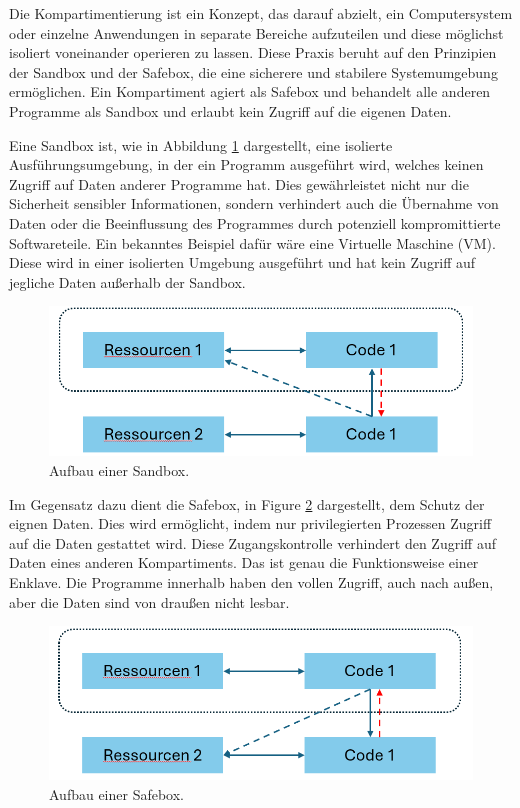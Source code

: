 Die Kompartimentierung ist ein Konzept, das darauf abzielt, ein Computersystem oder einzelne Anwendungen in separate Bereiche aufzuteilen und diese möglichst isoliert voneinander operieren zu lassen. Diese Praxis beruht auf den Prinzipien der Sandbox und der Safebox, die eine sicherere und stabilere Systemumgebung ermöglichen\cite{CIVPaper}. Ein Kompartiment agiert als Safebox und behandelt alle anderen Programme als Sandbox und erlaubt kein Zugriff auf die eigenen Daten.

Eine Sandbox ist, wie in Abbildung \ref{fig:Sandbox} dargestellt, eine isolierte Ausführungsumgebung, in der ein Programm ausgeführt wird, welches keinen Zugriff auf Daten anderer Programme hat. 
Dies gewährleistet nicht nur die Sicherheit sensibler Informationen, sondern verhindert auch die Übernahme von Daten oder die Beeinflussung des Programmes durch potenziell kompromittierte Softwareteile. 
Ein bekanntes Beispiel dafür wäre eine Virtuelle Maschine (VM). Diese wird in einer isolierten Umgebung ausgeführt und hat kein Zugriff auf jegliche Daten außerhalb der Sandbox.
\begin{figure}[h]
    \centering
    \includegraphics[width=0.8\linewidth]{Grafiken/Sandbox.png}
    \caption{Aufbau einer Sandbox.}
    \label{fig:Sandbox}
\end{figure}


Im Gegensatz dazu dient die Safebox, in Figure \ref{fig:Safebox} dargestellt, dem Schutz der eignen Daten. Dies wird ermöglicht, indem nur privilegierten Prozessen Zugriff auf die Daten gestattet wird. Diese Zugangskontrolle verhindert den Zugriff auf Daten eines anderen Kompartiments. 
Das ist genau die Funktionsweise einer Enklave. Die Programme innerhalb haben den vollen Zugriff, auch nach außen, aber die Daten sind von draußen nicht lesbar. \begin{figure}[h]
    \centering
    \includegraphics[width=0.8\linewidth]{Grafiken/Safebox.png}
    \caption{Aufbau einer Safebox.}
    \label{fig:Safebox}
\end{figure}

